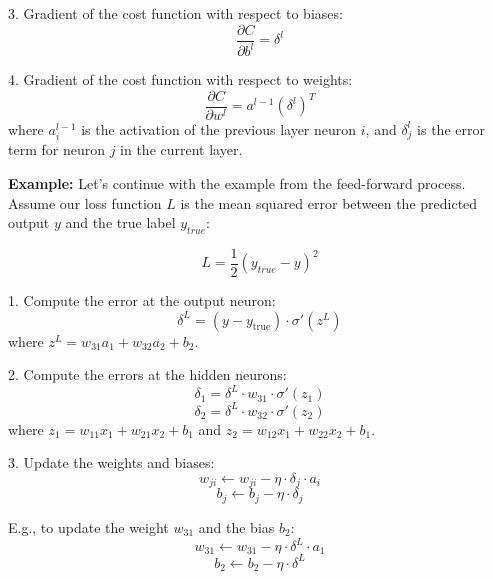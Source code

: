 \documentclass[english,11pt,a4paper,titlepage]{article}
\begin{document}
	3. Gradient of the cost function with respect to biases:
	\[
	\frac{\partial C}{\partial b^l} = \delta^l
	\]
	
	4. Gradient of the cost function with respect to weights:
	\[
	\frac{\partial C}{\partial w^l} = a^{l-1} (\delta^l)^T
	\]
    where \( a^{l-1}_i \) is the activation of the previous layer neuron \( i \), and \( \delta^l_j \) is the error term for neuron \( j \) in the current layer.
    
	\textbf{Example:}
	Let's continue with the example from the feed-forward process. Assume our loss function \( L \) is the mean squared error between the predicted output \( y \) and the true label \( y_{true} \):
	
	\begin{equation*}
		L = \frac{1}{2}(y_{true} - y)^2
	\end{equation*}
	
	1. Compute the error at the output neuron:
	\begin{equation*}
		\delta^L = (y - y_{\text{true}}) \cdot \sigma'(z^L)
	\end{equation*}
	where \( z^L = w_{31} a_1 + w_{32} a_2 + b_2 \).
	
	2. Compute the errors at the hidden neurons:
	\begin{equation*}
		\delta_1 = \delta^L \cdot w_{31} \cdot \sigma'(z_1)
	\end{equation*}
	\begin{equation*}
		\delta_2 = \delta^L \cdot w_{32} \cdot \sigma'(z_2)
	\end{equation*}
	where \( z_1 = w_{11} x_1 + w_{21} x_2 + b_1 \) and \( z_2 = w_{12} x_1 + w_{22} x_2 + b_1 \).
	
	3. Update the weights and biases:
	\begin{equation*}
		w_{ji} \leftarrow w_{ji} - \eta \cdot \delta_j \cdot a_i
	\end{equation*}
	\begin{equation*}
		b_j \leftarrow b_j - \eta \cdot \delta_j
	\end{equation*}
	
	E.g., to update the weight \( w_{31} \) and the bias \( b_2 \):
	\begin{equation*}
		w_{31} \leftarrow w_{31} - \eta \cdot \delta^L \cdot a_1
	\end{equation*}
	\begin{equation*}
		b_2 \leftarrow b_2 - \eta \cdot \delta^L
	\end{equation*}
	
\end{document}
